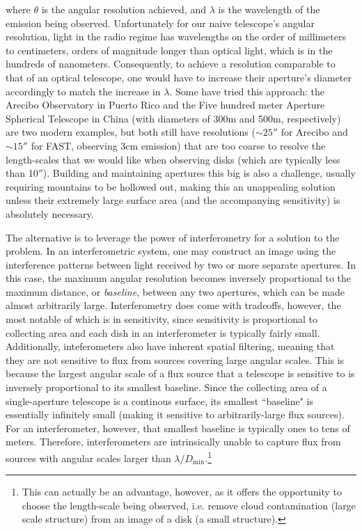 \noindent where $\theta$ is the angular resolution achieved, and $\lambda$ is the wavelength of the emission being observed. Unfortunately for our naive telescope's angular resolution, light in the radio regime has wavelengths on the order of millimeters to centimeters, orders of magnitude longer than optical light, which is in the hundreds of nanometers. Consequently, to achieve a resolution comparable to that of an optical telescope, one would have to increase their aperture's diameter accordingly to match the increase in $\lambda$. Some have tried this approach: the Arecibo Observatory in Puerto Rico and the Five hundred meter Aperture Spherical Telescope in China (with diameters of 300m and 500m, respectively) are two modern examples, but both still have resolutions ($\sim25''$ for Arecibo and $\sim15''$ for FAST, observing 3cm emission) that are too coarse to resolve the length-scales that we would like when observing disks (which are typically less than 10$''$). Building and maintaining apertures this big is also a challenge, usually requiring mountains to be hollowed out, making this an unappealing solution unless their extremely large surface area (and the accompanying sensitivity) is absolutely necessary.


The alternative is to leverage the power of interferometry for a solution to the problem. In an interferometric system, one may construct an image using the interference patterns between light received by two or more separate apertures. In this case, the maximum angular resolution becomes inversely proportional to the maximum distance, or \textit{baseline}, between any two  apertures, which can be made almost arbitrarily large. Interferometry does come with tradeoffs, however, the most notable of which is in sensitivity, since sensitivity is proportional to collecting area and each dish in an interferometer is typically fairly small. Additionally, inteferometers also have inherent spatial filtering, meaning that they are not sensitive to flux from sources covering large angular scales. This is because the largest angular scale of a flux source that a telescope is sensitive to is inversely proportional to its smallest baseline. Since the collecting area of a single-aperture telescope is a continous surface, its smallest ``baseline" is essentially infinitely small (making it sensitive to arbitrarily-large flux sources). For an interferometer, however, that smallest baseline is typically ones to tens of meters. Therefore, interferometers are intrinsically unable to capture flux from sources with angular scales larger than $\lambda/D_\text{min}$.\footnote{This can actually be an advantage, however, as it offers the opportunity to choose the length-scale being observed, i.e. remove cloud contamination (large scale structure) from an image of a disk (a small structure).}


